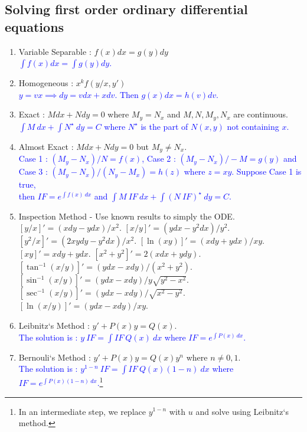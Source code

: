 \subsection{Solving first order ordinary differential equations}
\begin{enumerate}
	\item Variable Separable : $f(x)dx = g(y)dy$\\ 
	\textcolor{blue}{$\int f(x) dx = \int g(y) dy$.}
	\item Homogeneous : $x^k f(y/x,y')$ \\ 
	\textcolor{blue}{$y= vx \implies dy = vdx + xdv$. Then $g(x)dx = h(v)dv$.}
	\item Exact : $Mdx + Ndy = 0$ where $M_y = N_x$ and $M,N,M_y,N_x$ are continuous.\\
	\textcolor{blue}{$\int M\ dx + \int N^\star\ dy = C$ where $N^\star$ is the part of $N(x,y)$ not containing $x$.}
	\item Almost Exact : $Mdx + Ndy = 0$ but $M_y \ne N_x$. \\
		\textcolor{blue}{Case 1 : $(M_y - N_x)/N = f(x)$, Case 2 : $(M_y-N_x)/-M = g(y)$ and\\ Case 3 : $(M_y - N_x)/(N_y - M_x) = h(z)$ where $z = xy$.
		Suppose Case 1 is true,\\ then $I\!F = e^{\int f(x)\ dx}$ and $\int M\ I\!F\ dx + \int (N\ I\!F)^\star\ dy = C$.}
	\item Inspection Method - Use known results to simply the ODE.
		{\color{blue}
		\subitem $[y/x]' = (xdy - ydx)/x^2$.
		\subitem $[x/y]' = (ydx - y^2dx)/y^2$.
		\subitem $[y^2/x]' = (2xydy - y^2dx)/x^2$.
		\subitem $[\ln(xy)]' = (xdy+ydx)/xy$.
		\subitem $[xy]' = xdy + ydx$.
		\subitem $[x^2+y^2]' = 2(xdx + ydy)$.
		\subitem $[\tan^{-1} (x/y)]' = (ydx-xdy)/(x^2+y^2)$.
		\subitem $[\sin^{-1} (x/y)]' = (ydx-xdy)/y\sqrt{y^2-x^2}$.
		\subitem $[\sec^{-1} (x/y)]' = (ydx-xdy)/\sqrt{x^2-y^2}$.
		\subitem $[\ln(x/y)]' = (ydx-xdy)/xy$.
		}
	\item Leibnitz`s Method : $y'+P(x)y = Q(x)$.\\ 
	\textcolor{blue}{The solution is : $y\ I\!F = \int I\!F\ Q(x)\ dx$ where $I\!F = e^{\int P(x)\ dx}$.}
	\item Bernouli`s Method : $y'+P(x)y = Q(x)y^n$ where $n \ne 0,1$.\\ 
	\textcolor{blue}{The solution is : $y^{1-n}\ I\!F = \int I\!F\ Q(x)(1-n)\ dx$ where $I\!F = e^{\int P(x)(1-n)\ dx}$.\footnote{In an intermediate step, we replace $y^{1-n}$ with $u$ and solve using Leibnitz`s method.}}
\end{enumerate}

